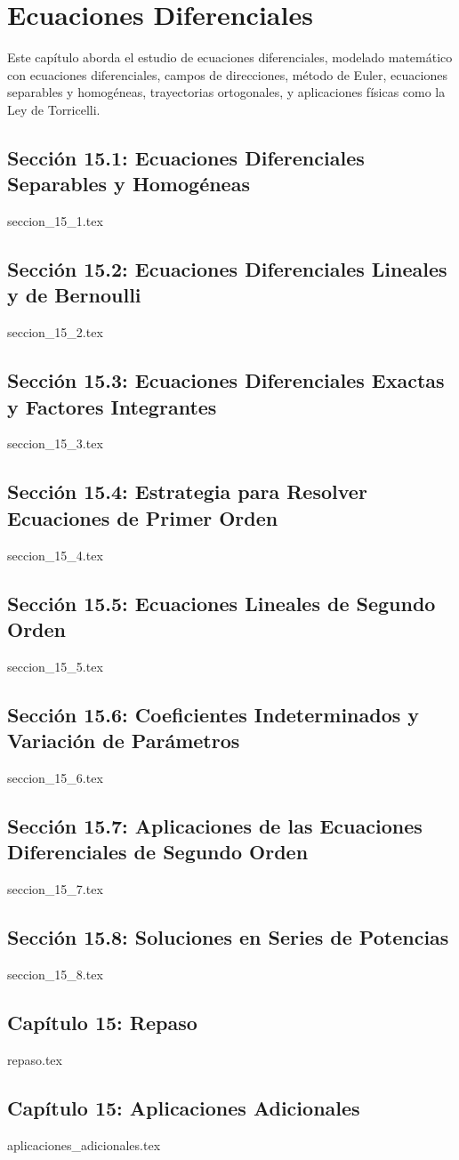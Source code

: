 \chapter{Ecuaciones Diferenciales}
\label{cap:ecuaciones_diferenciales}

Este capítulo aborda el estudio de ecuaciones diferenciales, modelado matemático con ecuaciones diferenciales, campos de direcciones, método de Euler, ecuaciones separables y homogéneas, trayectorias ortogonales, y aplicaciones físicas como la Ley de Torricelli.

\section*{Sección 15.1: Ecuaciones Diferenciales Separables y Homogéneas}
{seccion_15_1.tex}

\section*{Sección 15.2: Ecuaciones Diferenciales Lineales y de Bernoulli}
{seccion_15_2.tex}

\section*{Sección 15.3: Ecuaciones Diferenciales Exactas y Factores Integrantes}
{seccion_15_3.tex}

\section*{Sección 15.4: Estrategia para Resolver Ecuaciones de Primer Orden}
{seccion_15_4.tex}

\section*{Sección 15.5: Ecuaciones Lineales de Segundo Orden}
{seccion_15_5.tex}

\section*{Sección 15.6: Coeficientes Indeterminados y Variación de Parámetros}
{seccion_15_6.tex}

\section*{Sección 15.7: Aplicaciones de las Ecuaciones Diferenciales de Segundo Orden}
{seccion_15_7.tex}

\section*{Sección 15.8: Soluciones en Series de Potencias}
{seccion_15_8.tex}

\section*{Capítulo 15: Repaso}
{repaso.tex}

\section*{Capítulo 15: Aplicaciones Adicionales}
{aplicaciones_adicionales.tex}
